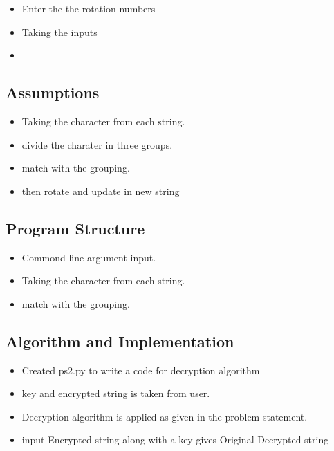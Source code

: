 \documentclass[a4paper,12pt]{article}
\begin{document}
\begin{itemize}
\item Enter the the rotation numbers
\item Taking the inputs
\item 
\end{itemize}
\subsection{Assumptions}
\begin{itemize}
\item Taking the character from each string.
\item divide the charater in three groups.
\item match with  the grouping.
\item then rotate and update in new string

\end{itemize}

\subsection{Program Structure}

\begin{itemize}
    \item Commond line argument input.
    \item Taking the character from each string.
    \item  match with  the grouping.
   
   
\end{itemize}

\subsection{Algorithm and Implementation}
\begin{itemize}
	\item Created ps2.py to write a code for decryption algorithm 
	\item key and encrypted string is taken from user.
	\item Decryption algorithm is applied as given in the problem statement.
	\item input Encrypted string along with a key gives Original Decrypted string

 
\end{itemize}
\end{document}
